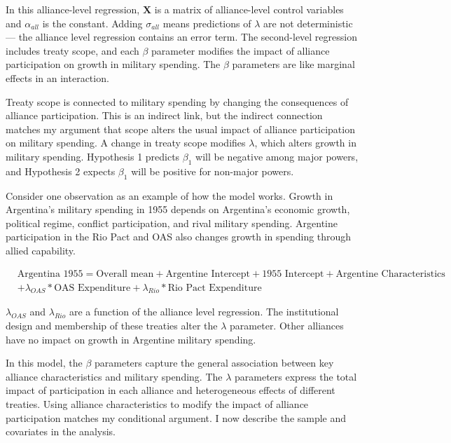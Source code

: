 \documentclass[12pt]{article}
\begin{document}
In this alliance-level regression, $\textbf{X}$ is a matrix of alliance-level control variables and $\alpha_{all}$ is the constant.
Adding $\sigma_{all}$ means predictions of $\lambda$ are not deterministic--- the alliance level regression contains an error term. 
The second-level regression includes treaty scope, and each $\beta$ parameter modifies the impact of alliance participation on growth in military spending. 
The $\beta$ parameters are like marginal effects in an interaction. 


Treaty scope is connected to military spending by changing the consequences of alliance participation.
This is an indirect link, but the indirect connection matches my argument that scope alters the usual impact of alliance participation on military spending.  
A change in treaty scope modifies $\lambda$, which alters growth in military spending.
Hypothesis 1 predicts $\beta_1$ will be negative among major powers, and Hypothesis 2 expects $\beta_1$ will be positive for non-major powers.  


Consider one observation as an example of how the model works. 
Growth in Argentina's military spending in 1955 depends on Argentina's economic growth, political regime, conflict participation, and rival military spending. 
Argentine participation in the Rio Pact and OAS also changes growth in spending through allied capability. 


\begin{equation}
\begin{split}
& \mbox{Argentina 1955} = \mbox{Overall mean}
+ \mbox{Argentine Intercept} + \mbox{1955 Intercept} 
+ \mbox{Argentine Characteristics} \\
& + \lambda_{OAS} * \mbox{OAS Expenditure} + \lambda_{Rio} * \mbox{Rio Pact Expenditure}
\end{split} 
\end{equation}


$\lambda_{OAS}$ and $\lambda_{Rio}$ are a function of the alliance level regression. 
The institutional design and membership of these treaties alter the $\lambda$ parameter.
Other alliances have no impact on growth in Argentine military spending. 


In this model, the $\beta$ parameters capture the general association between key alliance characteristics and military spending. 
The $\lambda$ parameters express the total impact of participation in each alliance and heterogeneous effects of different treaties. 
Using alliance characteristics to modify the impact of alliance participation matches my conditional argument. 
I now describe the sample and covariates in the analysis.  
\end{document}

